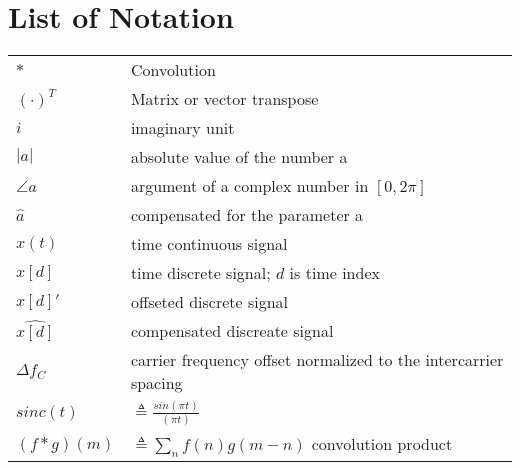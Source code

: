 \chapter* {List of Notation}

\begin{tabular}{p{70pt}p{330pt}}
    $\ast$ & Convolution\\
    $(\cdot)^T$ & Matrix or vector transpose \\
    $i$ 	& imaginary unit \\
   $|a|$ & absolute value of the number a \\
   $\angle{a}$ & argument of a complex number in $[0, 2 \pi]$ \\
   $\hat{a}$ 	& compensated for the parameter a \\
   $x(t)$ & time continuous signal \\
   $x[d]$ & time discrete signal; $d$ is time index \\
   $x[d]'$ &  offseted discrete signal \\
   $\widehat{x[d]}$ & compensated discreate signal \\
   $\Delta f_{C}$ & carrier frequency offset normalized to the intercarrier spacing \\
   $sinc(t)$ & $\triangleq \frac{sin(\pi t)}{(\pi t)}$ \\
   $(f * g)(m) $ &  $\triangleq \sum_{n} f(n)g(m - n)$ convolution product \\
\end{tabular}

